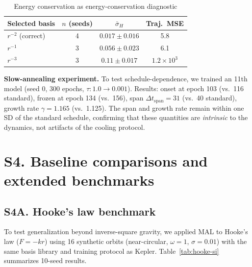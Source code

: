 \documentclass[aps,pre,reprint,superscriptaddress]{revtex4-2}
\begin{document}
\begin{table}[!ht]
\centering
\caption{Energy conservation as energy-conservation diagnostic}
\label{tab:noether-si}
\small
\begin{tabular}{lccc}
\hline
Selected basis & $n$ (seeds) & $\bar{\sigma}_H$ & Traj.\ MSE \\
\hline
$r^{-2}$ (correct) & 4 & $0.017 \pm 0.016$ & 5.8 \\
$r^{-1}$ & 3 & $0.056 \pm 0.023$ & 6.1 \\
$r^{-3}$ & 3 & $0.11 \pm 0.017$ & $1.2 \times 10^3$ \\
\hline
\end{tabular}
\end{table}

\textbf{Slow-annealing experiment.} To test schedule-dependence, we trained an 11th model (seed 0, 300 epochs, $\tau: 1.0 \to 0.001$). Results: onset at epoch 103 (vs.\ 116 standard), frozen at epoch 134 (vs.\ 156), span $\Delta t_{\text{span}} = 31$ (vs.\ 40 standard), growth rate $\gamma = 1.165$ (vs.\ 1.125). The span and growth rate remain within one SD of the standard schedule, confirming that these quantities are \textit{intrinsic} to the dynamics, not artifacts of the cooling protocol.

\section{S4. Baseline comparisons and extended benchmarks}

\subsection{S4A. Hooke's law benchmark}
To test generalization beyond inverse-square gravity, we applied MAL to Hooke's law ($F = -kr$) using 16 synthetic orbits (near-circular, $\omega = 1$, $\sigma = 0.01$) with the same basis library and training protocol as Kepler. Table~\ref{tab:hooke-si} summarizes 10-seed results.
\end{document}
